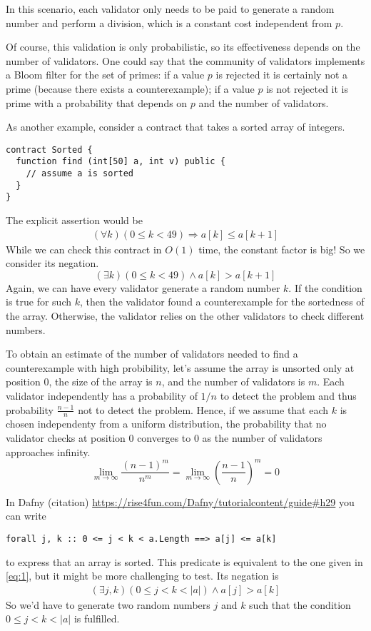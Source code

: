\documentclass{article}
\begin{document}
In this scenario, each validator only needs to be paid to generate a random number and
perform a division, which is a constant cost independent from $p$.

Of course, this validation is only probabilistic, so its effectiveness depends on the
number of validators. One could say that the community of validators implements a Bloom
filter for the set of primes: if a value $p$ is rejected it is certainly not a prime (because
there exists a counterexample); if a value $p$ is not rejected it is prime with a
probability that depends on $p$ and the number of validators. 

As another example, consider a contract that takes a sorted array of integers.
\begin{lstlisting}[numbers=none]
contract Sorted {
  function find (int[50] a, int v) public {
    // assume a is sorted
  }
}
\end{lstlisting}
The explicit assertion would be
\begin{gather}\label{eq:1}
  (\forall k) (0\le k <49) \Rightarrow a[k] \le a[k+1]
\end{gather}
While we can check this contract in $O(1)$ time, the constant factor is big! So we
consider its negation.
\begin{displaymath}
  (\exists k) (0\le k <49) \wedge a[k] > a[k+1]
\end{displaymath}
Again, we can have every validator generate a random number $k$. If the
condition is true for such $k$, then the validator found a counterexample for the sortedness
of the array. Otherwise, the validator relies on the other validators to check
different numbers.

To obtain an estimate of the number of validators needed to find a counterexample with
high probibility, 
let's assume the array is unsorted only at position $0$, the size of the array is $n$,
and the number of validators is $m$. Each validator independently has a probability of
$1/n$ to detect the problem and thus probability $\frac{n-1} n$ not to detect the
problem. Hence, if we assume that each $k$ is chosen independenty from a uniform distribution,
the probability that no validator checks at
position $0$ converges to $0$ as the number of validators approaches infinity.
\begin{displaymath}
  \lim_{m\to\infty}\frac{(n-1)^m}{n^m}
  = \lim_{m\to\infty} \left(\frac{n-1}{n}\right)^m
  = 0
\end{displaymath}

In Dafny (citation) \url{https://rise4fun.com/Dafny/tutorialcontent/guide#h29} you can
write
\begin{lstlisting}
forall j, k :: 0 <= j < k < a.Length ==> a[j] <= a[k]
\end{lstlisting}
to express that an array is sorted. This predicate is equivalent to the one given in
\eqref{eq:1}, but it might be more challenging to test. Its negation is
\begin{gather}
  \label{eq:2}
  (\exists j, k ) (0\le j< k < |a|) \wedge a[j] > a[k]
\end{gather}
So we'd have to generate two random numbers $j$ and $k$ such that the condition $0 \le
j < k < |a|$ is fulfilled.
\end{document}
